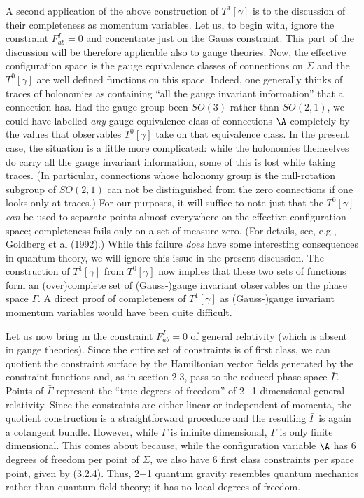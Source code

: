 A second application of the above construction of $T^1[\gamma ]$ is to the
discussion of their completeness as momentum variables. Let us, to begin
with, ignore the constraint $F_{ab}^I= 0$ and concentrate just on the
Gauss constraint. This part of the discussion will be therefore applicable
also to gauge theories. Now, the effective configuration space is the
gauge equivalence classes of connections on $\Sigma$ and the $T^0[\gamma ]$
are well defined functions on this space. Indeed, one generally thinks
of traces of holonomies as containing ``all the gauge invariant information''
that a connection has. Had the gauge group been $SO(3)$ rather than
$SO(2,1)$, we could have labelled {\it any} gauge equivalence class
of connections $\A$ completely by the values that observables $T^0[\gamma ]$
take on that equivalence class. In the present case, the situation is a little
more complicated: while the holonomies themselves do carry all the gauge
invariant information, some of this is lost while taking traces. (In
particular, connections whose holonomy group is the null-rotation subgroup
of $SO(2,1)$ can not be distinguished from the zero connections if one looks
only at traces.) For our purposes, it will suffice to note just that
the $T^0[\gamma ]$ {\it can} be used to separate points almost everywhere
on the effective configuration space; completeness fails only on a set of
measure zero. (For details, see, e.g., Goldberg et al (1992).) While this
failure {\it does} have some interesting consequences in quantum theory, we
will ignore this issue in the present discussion. The construction of
$T^1[\gamma ]$ from $T^0[\gamma ]$ now implies that these two sets of
functions form an (over)complete set of (Gauss-)gauge invariant observables
on the phase space $\Gamma$. A direct proof of completeness of $T^1[\gamma]$
as (Gauss-)gauge invariant momentum variables would have been quite difficult.

Let us now bring in the constraint $F_{ab}^I = 0$ of general relativity
(which is absent in gauge theories). Since the entire set of
constraints is of first class, we can quotient the constraint surface by the
Hamiltonian vector fields generated by the constraint functions and, as in
section 2.3, pass to the reduced phase space $\bar\Gamma$. Points of
$\bar\Gamma$ represent the ``true degrees of freedom'' of 2+1 dimensional
general relativity.  Since the constraints are either linear or independent
of momenta, the quotient construction is a straightforward procedure and
the resulting $\bar\Gamma$ is again a cotangent bundle. However, while
$\Gamma$ is infinite dimensional, $\bar\Gamma$ is only finite dimensional.
This comes about because, while the configuration variable $\A$ has 6
degrees of freedom per point of $\Sigma$, we also have 6 first class
constraints per space point, given by (3.2.4). Thus, 2+1 quantum gravity
resembles quantum mechanics rather than quantum field theory; it has no
local degrees of freedom.

